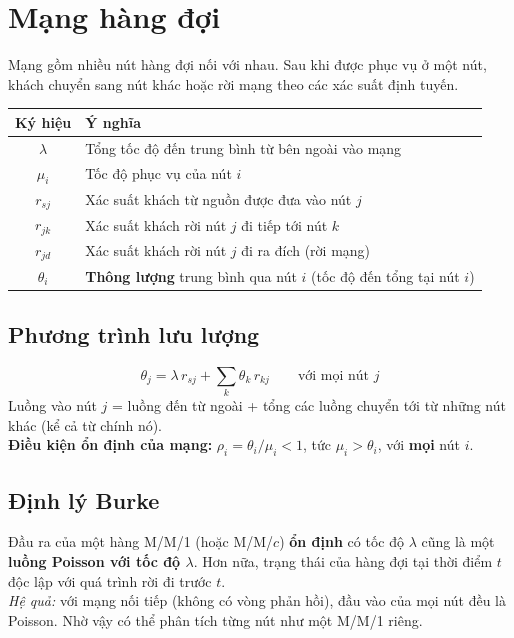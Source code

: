 \section{Mạng hàng đợi}

Mạng gồm nhiều nút hàng đợi nối với nhau. Sau khi được phục vụ ở một nút, khách chuyển sang nút khác hoặc rời mạng theo các xác suất định tuyến.

\begin{center}
\begin{tabularx}{\linewidth}{@{}c X@{}}
\toprule
\textbf{Ký hiệu} & \textbf{Ý nghĩa} \\
\midrule
$\lambda$ & Tổng tốc độ đến trung bình từ bên ngoài vào mạng \\
$\mu_i$ & Tốc độ phục vụ của nút $i$ \\
$r_{sj}$ & Xác suất khách từ nguồn được đưa vào nút $j$ \\
$r_{jk}$ & Xác suất khách rời nút $j$ đi tiếp tới nút $k$ \\
$r_{jd}$ & Xác suất khách rời nút $j$ đi ra đích (rời mạng) \\
$\theta_i$ & \textbf{Thông lượng} trung bình qua nút $i$ (tốc độ đến tổng tại nút $i$) \\
\bottomrule
\end{tabularx}
\end{center}

\subsection{Phương trình lưu lượng}

\begin{congthuc}
\[
\theta_j = \lambda\, r_{sj} + \sum_{k} \theta_k\, r_{kj}\qquad\text{với mọi nút } j
\]
Luồng vào nút $j$ = luồng đến từ ngoài + tổng các luồng chuyển tới từ những nút khác (kể cả từ chính nó).\\
\textbf{Điều kiện ổn định của mạng:} $\rho_i = \theta_i/\mu_i < 1$, tức $\mu_i > \theta_i$, với \textbf{mọi} nút $i$.
\end{congthuc}

\subsection{Định lý Burke}

Đầu ra của một hàng M/M/1 (hoặc M/M/$c$) \textbf{ổn định} có tốc độ $\lambda$ cũng là một \textbf{luồng Poisson với tốc độ $\lambda$}. Hơn nữa, trạng thái của hàng đợi tại thời điểm $t$ độc lập với quá trình rời đi trước $t$.\\
\emph{Hệ quả:} với mạng nối tiếp (không có vòng phản hồi), đầu vào của mọi nút đều là Poisson. Nhờ vậy có thể phân tích từng nút như một M/M/1 riêng.

